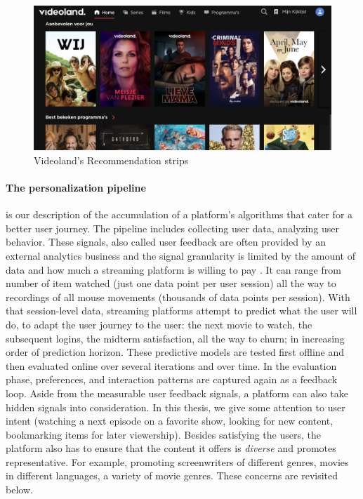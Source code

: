 \begin{figure}[h]
  \centering
  \includegraphics[width=\textwidth]{01-introduction/images/VLHome_cropped.png}
  \caption{Videoland's Recommendation strips}
  \label{fig:VLStrip}
\end{figure}

\paragraph{The personalization pipeline} is our description of the accumulation of a platform's algorithms that cater for a better user journey. The pipeline includes collecting user data, analyzing user behavior. These signals, also called user feedback are often provided by an external analytics business and the signal granularity is limited by the amount of data and how much a streaming platform is willing to pay \tocite{}. It can range from number of item watched (just one data point per user session) all the way to recordings of all mouse movements (thousands of data points per session). With that session-level data, streaming platforms attempt to predict what the user will do, to adapt the user journey to the user: the next movie to watch, the subsequent logins, the midterm satisfaction, all the way to churn; in increasing order of prediction horizon. These predictive models are tested first offline and then evaluated online over several iterations and over time. In the evaluation phase, preferences, and interaction patterns are captured again as a feedback loop. Aside from the measurable user feedback signals, a platform can also take hidden signals into consideration. In this thesis, we give some attention to user intent (watching a next episode on a favorite show, looking for new content, bookmarking items for later viewership). Besides satisfying the users, the platform also has to ensure that the content it offers is \emph{diverse} and promotes representative. For example, promoting screenwriters of different genres, movies in different languages, a variety of movie genres. These concerns are revisited below.


